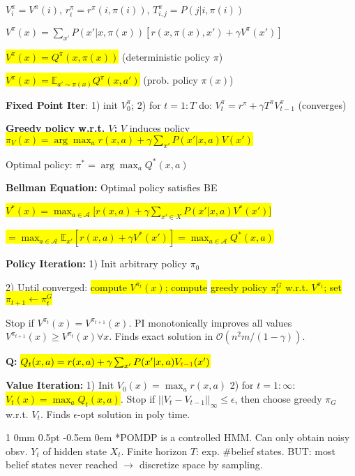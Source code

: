 \documentclass[11pt,landscape,a4paper,fleqn]{article}
\makeatletter
\newcommand*{\rsection}{%
	\@startsection{section}%
	{1}%
	{0mm}%
	{0.5pt}%
	{-0.5em \@plus 0em}
	{\color{myorange}\sffamily\small\bfseries}}
\newcommand{\mhl}[1]{\setlength{\fboxsep}{0pt}\colorbox{yellow}{#1}}
\makeatother
\begin{document}
\begin{multicols*}{4}
$V_i^\pi = V^\pi(i)$, $r_i^\pi = r^\pi(i, \pi(i))$, $T_{i,j}^\pi = P(j | i,\pi(i))$

\vspace*{-1mm}
\mbox{$V^\pi(x) = \sum_{x'} P(x' | x, \pi(x)) [r(x,\pi(x),x') + \gamma V^\pi(x')]$}

\mhl{$V^\pi(x) = Q^\pi(x, \pi(x))$} (deterministic policy $\pi$)

\mhl{$V^\pi(x) = \mathbb{E}_{a' \sim \pi(x)} Q^\pi(x,a')$} (prob. policy $\pi(x)$)

\textbf{Fixed Point Iter}: 1) init $V_0^\pi$; 2) for $t=1:T$ do: $V_t^\pi = r^\pi + \gamma T^\pi V_{t-1}^\pi$ (converges)

\textbf{Greedy policy w.r.t. $V$:} $V$ induces policy\\
\mhl{$\pi_V(x) = \arg\max_a r(x,a) + \gamma \sum_{x'} P(x' | x,a) V(x')$}

Optimal policy: $\pi^* = \arg\max_a Q^*(x,a)$

\textbf{Bellman Equation:} {\fontsize{9.5}{6}\selectfont Optimal policy satisfies BE}

\mhl{$V^*(x) = \max_{a \in \mathcal{A}} \big[ r(x,a) + \gamma \sum_{x' \in X} P(x' | x,a) V^*(x') \big]$}

\mhl{$ = \max_{a \in \mathcal{A}} \mathbb{E}_{x'}[r(x,a) + \gamma V^*(x')] = \max_{a \in \mathcal{A}} Q^*(x,a)$}

\textbf{Policy Iteration:} 1) Init arbitrary policy $\pi_0$

2) Until converged: \mhl{compute $V^{\pi_t}(x)$; compute}
\mhl{greedy policy $\pi_t^G$ w.r.t. $V^{\pi_t}$; set $\pi_{t+1} \leftarrow \pi_t^G$}

Stop if $V^{\pi_t}(x) = V^{\pi_{t+1}}(x)$.  PI monotonically improves all values $V^{\pi_{t+1}}(x) \geq V^{\pi_{t}}(x) \forall x$. Finds exact solution in $\mathcal{O}(n^2 m / (1-\gamma))$.

\textbf{Q:} \mhl{$Q_t(x,a) = r(x,a) + \gamma \sum_{x'} P(x' | x,a) V_{\textcolor{red}{t-1}}(x')$}

\textbf{Value Iteration:} 1) Init $V_0(x) = \max_a r(x,a)$ 2) for $t = 1:\infty$: \mhl{$V_t(x) = \max_a Q_t(x,a)$}. Stop if $||V_t - V_{t-1}||_\infty \leq \epsilon$, then choose greedy $\pi_G$ w.r.t. $V_t$. Finds $\epsilon$-opt solution in poly time.


\rsection*{POMDP} is a controlled HMM. Can only obtain noisy obsv. $Y_t$ of hidden state $X_t$. Finite horizon $T$: exp. \#belief states. BUT: most belief states never reached $\rightarrow$ discretize space by sampling.


\end{multicols*}
\end{document}
